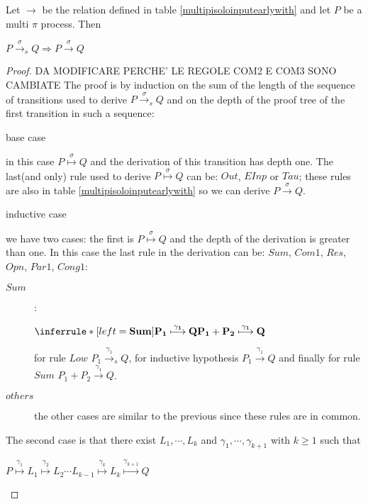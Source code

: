 \begin{proposition}
  Let $\rightarrow$ be the relation defined in table \ref{multipisoloinputearlywith} and let $P$ be a multi $\pi$ process. Then 
  \begin{center}
    $P\xrightarrow{\sigma}_{s} Q  \Rightarrow P\xrightarrow{\sigma} Q$
  \end{center}
  \begin{proof}
    DA MODIFICARE PERCHE' LE REGOLE COM2 E COM3 SONO CAMBIATE     
    The proof is by induction on the sum of the length of the sequence of transitions used to derive $P\xrightarrow{\sigma}_{s} Q$ and on the depth of the proof tree of the first transition in such a sequence:
    \begin{description}
      \item[base case]
    \end{description}
	in this case $P\stackrel{\sigma}{\longmapsto} Q$ and the derivation of this transition has depth one. The last(and only) rule used to derive $P\stackrel{\sigma}{\longmapsto} Q$ can be: $Out$, $EInp$ or $Tau$; these rules are also in table \ref{multipisoloinputearlywith} so we can derive $P\xrightarrow{\sigma} Q$.
    \begin{description}
      \item[inductive case]
    \end{description}
	we have two cases: the first is $P\stackrel{\sigma}{\longmapsto} Q$ and the depth of the derivation is greater than one. In this case the last rule in the derivation can be: $Sum$, $Com1$, $Res$, $Opn$, $Par1$, $Cong1$:
	\begin{description}
	  \item[$Sum$]:
		\begin{center}
		  $\inferrule* [left=\bf{Sum}]{
		      P_{1} \stackrel{\gamma_{1}}{\longmapsto} Q
		    }{
		      P_{1}+P_{2} \stackrel{\gamma_{1}}{\longmapsto} Q
		  }$ 
		\end{center}
	    for rule $Low$ $P_{1} \xrightarrow{\gamma_{1}}_{s} Q$, for inductive hypothesis $P_{1} \xrightarrow{\gamma_{1}} Q$ and finally for rule $Sum$ $P_{1}+P_{2} \xrightarrow{\gamma_{1}} Q$.
	  \item[$others$] 
	    the other cases are similar to the previous since these rules are in common. 
	\end{description}
	The second case is that there exist $L_{1}, \cdots, L_{k}$ and $\gamma_{1}, \cdots, \gamma_{k+1}$ with $k\geq 1$ such that 
	\begin{center}
	  $P \stackrel{\gamma_{1}}{\longmapsto} L_{1}  \stackrel{\gamma_{2}}{\longmapsto} L_{2} \cdots L_{k-1} \stackrel{\gamma_{k}}{\longmapsto} L_{k} \stackrel{\gamma_{k+1}}{\longmapsto} Q$ 

\end{center}
\end{proof}
\end{proposition}
